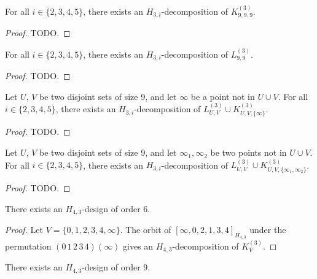 \begin{subappendices}
\begin{example} \label{eg:H_3i-k999}
For all $i \in \{2,3,4,5\}$, there exists an $H_{3,i}$-decomposition of $K_{9,9,9}^{(3)}$.
\end{example}

\begin{proof}
TODO.
\end{proof}


\begin{example} \label{eg:H_3i-l99}
For all $i \in \{2,3,4,5\}$, there exists an $H_{3,i}$-decomposition of $L_{9,9}^{(3)}$.
\end{example}

\begin{proof}
TODO.
\end{proof}


\begin{example} \label{eg:H_3i-l99-k991}
Let $U$, $V$ be two disjoint sets of size 9, and let $\infty$ be a point not in $U \cup V$.
For all $i \in \{2,3,4,5\}$, there exists an $H_{3,i}$-decomposition of $L_{U,V}^{(3)} \cup K_{U,V,\{\infty\}}^{(3)}$.
\end{example}

\begin{proof}
TODO.
\end{proof}


\begin{example} \label{eg:H_3i-l99-k992}
Let $U$, $V$ be two disjoint sets of size 9, and let $\infty_1, \infty_2$ be two points not in $U \cup V$.
For all $i \in \{2,3,4,5\}$, there exists an $H_{3,i}$-decomposition of $L_{U,V}^{(3)} \cup K_{U,V,\{\infty_1, \infty_2\}}^{(3)}$.
\end{example}

\begin{proof}
TODO.
\end{proof}



\begin{example} \label{eg:H_43-6}
There exists an $H_{4,3}$-design of order 6.
\end{example}

\begin{proof}
Let $V = \{0,1,2,3,4,\infty\}$. The orbit of $[\infty, 0, 2, 1, 3, 4]_{H_{4,3}}$ under the permutation $(0\, 1\, 2\, 3\, 4)(\infty)$ gives an $H_{4,3}$-decomposition of $K_V^{(3)}$.
\end{proof}



\begin{example} \label{eg:H_43-9}
There exists an $H_{4,3}$-design of order 9.
\end{example}


\end{subappendices}
